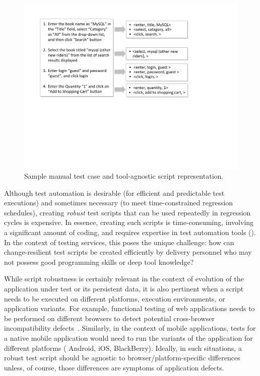 \begin{figure}[t]
\centering
\includegraphics[width=\columnwidth, clip, trim = 21mm 93mm 65mm
  18mm]{figs/sample-test-case.pdf}
\vspace*{-15pt}
\caption{Sample manual test case and tool-agnostic script representation.}
\vspace*{-10pt}
\label{fig:sample-test-case}
\end{figure}

Although test automation is desirable (\eg for efficient and predictable test
executions) and sometimes necessary (\eg to meet time-constrained regression
schedules), creating \textit{robust} test scripts that can be used repeatedly in
regression cycles is expensive. In essence, creating such scripts is
time-consuming, involving a significant amount of coding, and requires expertise
in test automation tools (\eg \cite{hpqtp,ibmrft,selenium}). In the context of
testing services, this poses the unique challenge: how can change-resilient test
scripts be created efficiently by delivery personnel who may not possess good
programming skills or deep tool knowledge?


While script robustness is certainly relevant in the context of evolution of the
application under test or its persistent data, it is also pertinent when a
script needs to be executed on different platforms, execution environments, or
application variants. For example, functional testing of web applications needs
to be performed on different browsers to detect potential cross-browser
incompatibility
defects~\cite{Choudhary2010,Shauvik:2012,Choudhary:2013,Mesbah:2011}. Similarly,
in the context of mobile applications, tests for a native mobile application
would need to run the variants of the application for different platforms (\eg
Android, iOS, BlackBerry). Ideally, in such situations, a robust test script
should be agnostic to browser/platform-specific differences unless, of course,
those differences are symptoms of application defects.

